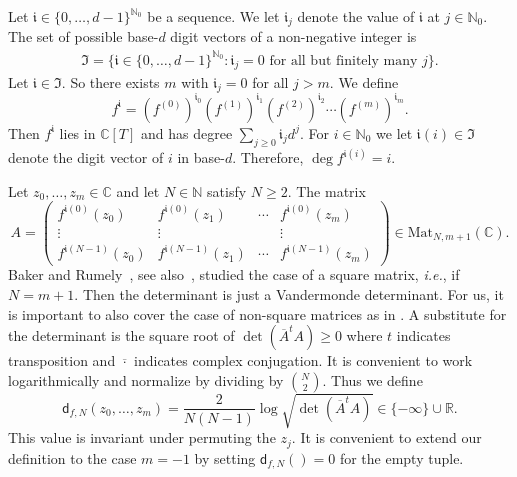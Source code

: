 \documentclass[12pt,oneside,a4]{amsart}
\newcommand{\IC}{\mathbb{C}}
\newcommand{\IN}{\mathbb{N}}
\newcommand{\IR}{\mathbb{R}}
\newcommand{\mat}[1]{\mathrm{Mat}_{#1}}
\numberwithin{maincounter}{section}
\numberwithin{equation}{section}
\renewcommand{\mat}{\mathrm{Mat}}
\begin{document}
Let $\mathfrak i \in \{0,\ldots,d-1\}^{\IN_0}$ be a sequence. We let
$\mathfrak{i}_j$ denote the value of $\mathfrak{i}$ at $j\in\IN_0$. 
The set of possible  base-$d$ digit vectors of a non-negative integer is
\begin{equation}
  \label{def:frakI}
  \begin{aligned}
    \mathfrak{I}
    =\bigl\{  \mathfrak{i} \in\{0,\ldots,d-1\}^{\IN_0} : \mathfrak{i}_j =
    0\text{ for all but finitely many $j$} \bigr\}.
  \end{aligned}
\end{equation}
Let $\mathfrak{i}\in \mathfrak{I}$.
So there exists $m$ with  $\mathfrak{i}_j=0$ for all 
$j>m$. We define
\begin{equation}
  \label{eq:definefi}
  f^\mathfrak{i} = (f^{(0)})^{\mathfrak{i}_0}(f^{(1)})^{\mathfrak{i}_1}(f^{(2)})^{\mathfrak{i}_2}\cdots
  (f^{(m)})^{\mathfrak{i}_m}.  
\end{equation}
Then $f^{\mathfrak{i}}$ lies in $\IC[T]$ and has degree $\sum_{j\ge 0}
\mathfrak{i}_j d^j$. For $i\in\IN_0$  we let
$\mathfrak{i}(i) \in \mathfrak{I}$ denote the digit vector of $i$ in
base-$d$.
Therefore, $\deg f^{\mathfrak{i}(i)} = i$.




Let $z_0,\ldots,z_m\in \IC$ and let $N\in\IN$ satisfy $N\ge 2$. 
The matrix 
\begin{equation}
  \label{def:A}
  A = \left(
    \begin{array}{cccc}
      f^{\mathfrak{i}(0)}(z_0)
      & f^{\mathfrak{i}(0)}(z_1)
      &\cdots
      &f^{\mathfrak{i}(0)}(z_m)
      \\
      \vdots
      & \vdots
      &
      & \vdots
      \\
      f^{\mathfrak{i}(N-1)}(z_0)
      &f^{\mathfrak{i}(N-1)}(z_1)
      &\cdots
      &f^{\mathfrak{i}(N-1)}(z_m)
    \end{array}
  \right) \in \mat_{N,m+1}(\IC).
\end{equation}
Baker and Rumely~\cite{BR:06}, see also~\cite{Baker:06}, studied 
 the case of a square matrix, \textit{i.e.}, if $N=m+1$. Then the
 determinant is just a Vandermonde determinant.
For us, it is important
to also cover the case of non-square matrices as in \cite{hab:dubinin}. 
A substitute for the determinant is the square root of $\det
(\overline{A}^tA) \ge 0$ where $t$ indicates transposition and
$\overline{\cdot}$ indicates complex conjugation.
It is convenient to work logarithmically and normalize by
dividing by ${N\choose 2}$. Thus we define
\begin{equation}
  \label{def:dynvandermonde}
  \mathsf{d}_{f,N}(z_0,\ldots,z_m)=\frac{2}{N(N-1)} \log \sqrt{\det({\overline
    A}^t{A})} \in \{-\infty\}\cup\IR.
\end{equation}
This value is invariant under permuting the $z_j$.
It is convenient to extend our definition to the case $m=-1$ by
setting $\mathsf{d}_{f,N}() = 0$ for the empty tuple.
\end{document}
